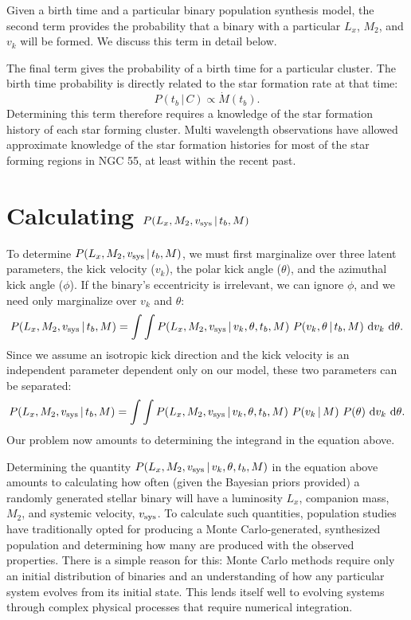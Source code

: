 \documentclass[12pt, preprint]{aastex}
\newcommand{\given}{\,|\,}
\newcommand{\dd}{\mathrm{d}}
\begin{document}
Given a birth time and a particular binary population synthesis model, the second term provides the probability that a binary with a particular $L_x$, $M_2$, and $v_k$ will be formed. We discuss this term in detail below.

The final term gives the probability of a birth time for a particular cluster. The birth time probability is directly related to the star formation rate at that time:
\begin{equation}
P(t_b \given C) \propto \dot{M}(t_b).
\end{equation} 
Determining this term therefore requires a knowledge of the star formation history of each star forming cluster. Multi wavelength observations have allowed approximate knowledge of the star formation histories for most of the star forming regions in NGC 55, at least within the recent past.

 
 
\section{Calculating $P(L_x, M_2, v_{\rm sys} \given t_b, M)$}

To determine $P(L_x, M_2, v_{\rm sys} \given t_b, M)$, we must first marginalize over three latent parameters, the kick velocity ($v_k$), the polar kick angle ($\theta$), and the azimuthal kick angle ($\phi$). If the binary's eccentricity is irrelevant, we can ignore $\phi$, and we need only marginalize over $v_k$ and $\theta$:
\begin{equation}
P(L_x, M_2, v_{\rm sys} \given t_b, M) = \int \int P(L_x, M_2, v_{\rm sys} \given v_k, \theta, t_b, M)\ P(v_k, \theta \given t_b, M)\ \dd v_k\ \dd \theta.
\end{equation}
Since we assume an isotropic kick direction and the kick velocity is an independent parameter dependent only on our model, these two parameters can be separated:
\begin{equation}
P(L_x, M_2, v_{\rm sys} \given t_b, M) = \int \int P(L_x, M_2, v_{\rm sys} \given v_k, \theta, t_b, M)\ P(v_k \given M)\ P(\theta)\ \dd v_k\ \dd \theta. \label{eq:P_marginalized}
\end{equation}
Our problem now amounts to determining the integrand in the equation above.


Determining the quantity $P(L_x, M_2, v_{\rm sys} \given v_k, \theta, t_b, M)$ in the equation above amounts to calculating how often (given the Bayesian priors provided) a randomly generated stellar binary will have a luminosity $L_x$, companion mass, $M_2$, and systemic velocity, $v_{\rm sys}$. To calculate such quantities, population studies have traditionally opted for producing a Monte Carlo-generated, synthesized population and determining how many are produced with the observed properties. There is a simple reason for this: Monte Carlo methods require only an initial distribution of binaries and an understanding of how any particular system evolves from its initial state. This lends itself well to evolving systems through complex physical processes that require numerical integration. 
\end{document}

